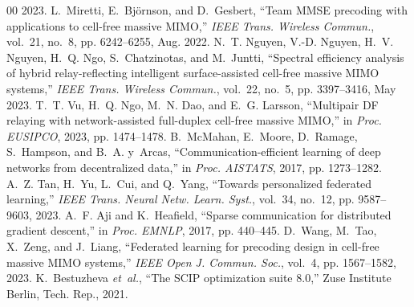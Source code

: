 \documentclass[conference]{IEEEtran}
\begin{document}
\begin{thebibliography}{00}
2023.
 L.~Miretti, E.~Bj\"ornson, and D.~Gesbert, ``Team
MMSE precoding with applications to cell-free massive MIMO,'' \emph{IEEE
Trans. Wireless Commun.}, vol.~21, no.~8, pp. 6242--6255, Aug. 2022.
 N.~T. Nguyen, V.-D. Nguyen, H.~V. Nguyen, H.~Q.
Ngo, S.~Chatzinotas, and M.~Juntti, ``Spectral efficiency analysis of hybrid
relay-reflecting intelligent surface-assisted cell-free massive MIMO
systems,'' \emph{IEEE Trans. Wireless Commun.}, vol.~22, no.~5, pp.
3397--3416, May 2023.
 T.~T. Vu, H.~Q. Ngo, M.~N. Dao, and E.~G. Larsson,
``Multipair DF relaying with network-assisted full-duplex cell-free massive
MIMO,'' in \emph{Proc. EUSIPCO}, 2023, pp. 1474--1478.
 B.~McMahan, E.~Moore, D.~Ramage, S.~Hampson,
and B.~A. y~Arcas, ``Communication-efficient learning of deep networks from
decentralized data,'' in \emph{Proc. AISTATS}, 2017, pp. 1273--1282.
 A.~Z. Tan, H.~Yu, L.~Cui, and Q.~Yang,
``Towards personalized federated learning,'' \emph{IEEE Trans. Neural Netw.
Learn. Syst.}, vol.~34, no.~12, pp. 9587--9603, 2023.
 A.~F. Aji and K.~Heafield, ``Sparse communication
for distributed gradient descent,'' in \emph{Proc. EMNLP}, 2017, pp.
440--445.
 D.~Wang, M.~Tao, X.~Zeng, and J.~Liang,
``Federated learning for precoding design in cell-free massive MIMO
systems,'' \emph{IEEE Open J. Commun. Soc.}, vol.~4, pp. 1567--1582, 2023.
 K.~Bestuzheva \emph{et~al.}, ``The SCIP
optimization suite 8.0,'' Zuse Institute Berlin, Tech. Rep., 2021.
\end{thebibliography}
\end{document}
